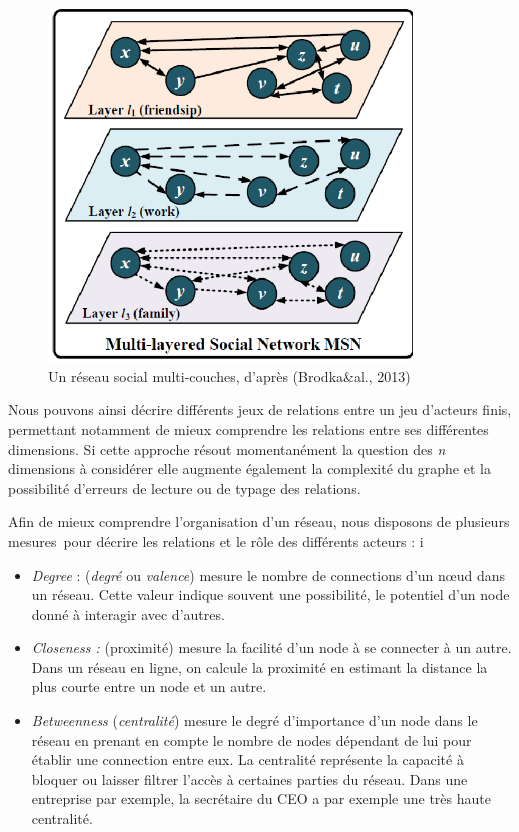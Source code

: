 \begin{figure}
    \centering
    \includegraphics[width=3.8004in,height=3.6894in]{figures/chap3/chapitre3-img3.png}
    \caption [r\'eseau social multi-couches] {Un r\'eseau social multi-couches, d{\textquoteright}apr\`es (Brodka\&al., 2013)}
\end{figure}

Nous pouvons ainsi d\'ecrire diff\'erents jeux de relations entre un jeu
d{\textquoteright}acteurs finis, permettant notamment de mieux
comprendre les relations entre ses diff\'erentes dimensions. Si cette
approche r\'esout momentan\'ement la question des \textit{n }dimensions
\`a consid\'erer \citep{Brodka2013} elle augmente \'egalement la
complexit\'e du graphe et la possibilit\'e d{\textquoteright}erreurs de
lecture ou de typage des relations. 

Afin de mieux comprendre l{\textquoteright}organisation
d{\textquoteright}un r\'eseau, nous disposons de plusieurs mesures~pour
d\'ecrire les relations et le r\^ole des diff\'erents acteurs : 
i
\begin{itemize}
\item \textit{Degree} : (\textit{degr\'e} ou \textit{valence}) mesure le
nombre de connections d{\textquoteright}un n{\oe}ud dans un r\'eseau.
Cette valeur indique souvent une possibilit\'e, le potentiel
d{\textquoteright}un node donn\'e \`a interagir avec
d{\textquoteright}autres. 
\item \textit{Closeness : }(proximit\'e) mesure la facilit\'e
d{\textquoteright}un node \`a se connecter \`a un autre. Dans un
r\'eseau en ligne, on calcule la proximit\'e en estimant la distance la
plus courte entre un node et un autre. 
\item \textit{Betweenness} (\textit{centralit\'e}) mesure le degr\'e
d{\textquoteright}importance d{\textquoteright}un node dans le r\'eseau
en prenant en compte le nombre de nodes d\'ependant de lui pour
\'etablir une connection entre eux. La centralit\'e repr\'esente la
capacit\'e \`a bloquer ou laisser filtrer l{\textquoteright}acc\`es \`a
certaines parties du r\'eseau. Dans une entreprise par exemple, la
secr\'etaire du CEO a par exemple une tr\`es haute centralit\'e.
\end{itemize}


